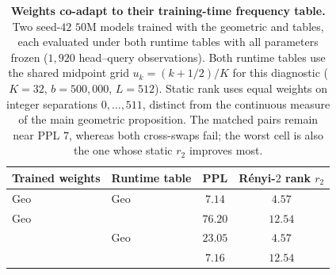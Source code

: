\begin{table}[h]
\centering
\small
\setlength{\tabcolsep}{6pt}
\renewcommand{\arraystretch}{0.95}
\caption{\textbf{Weights co-adapt to their training-time frequency table.} Two
seed-$42$ $50$M models trained with the geometric and \evq{} tables, each
evaluated under both runtime tables with all parameters frozen ($1{,}920$
head--query observations). Both runtime tables use the shared midpoint grid
$u_k=(k+1/2)/K$ for this diagnostic ($K=32$, $b=500{,}000$, $L=512$). Static rank uses equal weights on integer separations $0,\ldots,511$, distinct from the continuous measure of the main geometric proposition. The matched pairs remain near PPL $7$, whereas both
cross-swaps fail; the worst cell is also the one whose static $r_2$ improves
most.}
\label{tab:coadapt}
\begin{tabular}{@{}llcc@{}}
\toprule
Trained weights & Runtime table & PPL & Rényi-$2$ rank $r_2$ \\
\midrule
Geo   & Geo   & $\mathbf{7.14}$ & $4.57$ \\
Geo   & \evq{} & $76.20$ & $\mathbf{12.54}$ \\
\evq{} & Geo   & $23.05$ & $4.57$ \\
\evq{} & \evq{} & $\mathbf{7.16}$ & $12.54$ \\
\bottomrule
\end{tabular}
\end{table}
